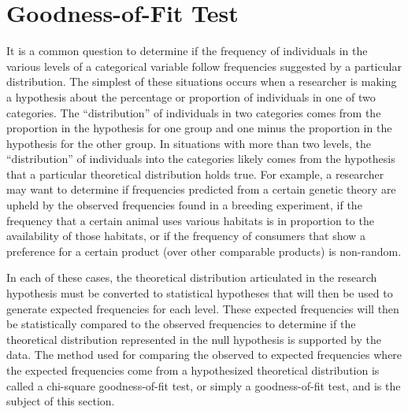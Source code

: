 \documentclass[10pt,openany]{book}\usepackage[]{graphicx}\usepackage[]{color}
\begin{document}
\section{Goodness-of-Fit Test}
It is a common question to determine if the frequency of individuals in the various levels of a categorical variable follow frequencies suggested by a particular distribution.  The simplest of these situations occurs when a researcher is making a hypothesis about the percentage or proportion of individuals in one of two categories.  The ``distribution'' of individuals in two categories comes from the proportion in the hypothesis for one group and one minus the proportion in the hypothesis for the other group.  In situations with more than two levels, the ``distribution'' of individuals into the categories likely comes from the hypothesis that a particular theoretical distribution holds true.  For example, a researcher may want to determine if frequencies predicted from a certain genetic theory are upheld by the observed frequencies found in a breeding experiment, if the frequency that a certain animal uses various habitats is in proportion to the availability of those habitats, or if the frequency of consumers that show a preference for a certain product (over other comparable products) is non-random.

In each of these cases, the theoretical distribution articulated in the research hypothesis must be converted to statistical hypotheses that will then be used to generate expected frequencies for each level.  These expected frequencies will then be statistically compared to the observed frequencies to determine if the theoretical distribution represented in the null hypothesis is supported by the data.  The method used for comparing the observed to expected frequencies where the expected frequencies come from a hypothesized theoretical distribution is called a chi-square goodness-of-fit test, or simply a goodness-of-fit test, and is the subject of this section.

\end{document}
